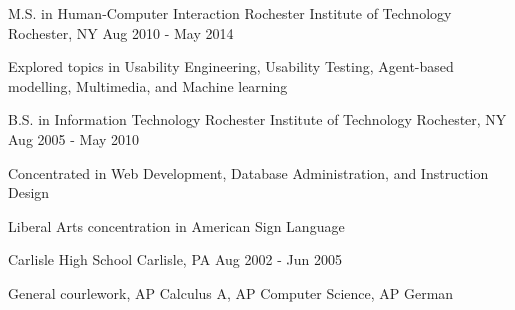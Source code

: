 

\begin{cventries}

  \cventry
    {M.S. in Human-Computer Interaction} %
    {Rochester Institute of Technology} %
    {Rochester, NY} %
    {Aug 2010 - May 2014} %
    {
      \begin{cvitems} %
        \item {Explored topics in Usability Engineering, Usability Testing, Agent-based modelling, Multimedia, and Machine learning}
      \end{cvitems}
    }


  \cventry
    {B.S. in Information Technology} %
    {Rochester Institute of Technology} %
    {Rochester, NY} %
    {Aug 2005 - May 2010} %
    {
      \begin{cvitems} %
        \item {Concentrated in Web Development, Database Administration, and Instruction Design}
        \item {Liberal Arts concentration in American Sign Language}
      \end{cvitems}
    }


  \cventry
    {} %
    {Carlisle High School} %
    {Carlisle, PA} %
    { Aug 2002 - Jun 2005} %
    {
      \begin{cvitems} %
        \item {General courlework, AP Calculus A, AP Computer Science, AP German}
      \end{cvitems}
    }

\end{cventries}
